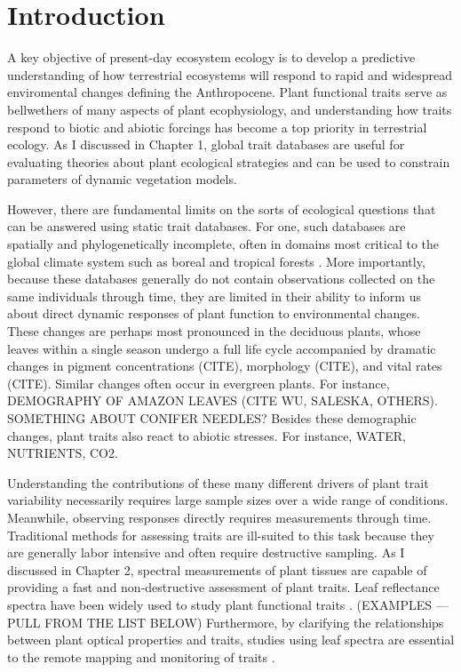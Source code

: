 \section{Introduction}

A key objective of present-day ecosystem ecology is to develop a predictive understanding of how terrestrial ecosystems will respond to rapid and widespread enviromental changes defining the Anthropocene. 
Plant functional traits serve as bellwethers of many aspects of plant ecophysiology, and understanding how traits respond to biotic and abiotic forcings has become a top priority in terrestrial ecology.
As I discussed in Chapter 1, global trait databases are useful for evaluating theories about plant ecological strategies and can be used to constrain parameters of dynamic vegetation models.

However, there are fundamental limits on the sorts of ecological questions that can be answered using static trait databases.
For one, such databases are spatially and phylogenetically incomplete, often in domains most critical to the global climate system such as boreal and tropical forests \cite{jetz2016_diversity}.
More importantly, because these databases generally do not contain observations collected on the same individuals through time, they are limited in their ability to inform us about direct dynamic responses of plant function to environmental changes.
These changes are perhaps most pronounced in the deciduous plants, whose leaves within a single season undergo a full life cycle accompanied by dramatic changes in pigment concentrations (CITE), morphology (CITE), and vital rates (CITE).
Similar changes often occur in evergreen plants.
For instance, DEMOGRAPHY OF AMAZON LEAVES (CITE WU, SALESKA, OTHERS).
SOMETHING ABOUT CONIFER NEEDLES?
Besides these demographic changes, plant traits also react to abiotic stresses.
For instance, WATER, NUTRIENTS, CO2.

Understanding the contributions of these many different drivers of plant trait variability necessarily requires large sample sizes over a wide range of conditions.
Meanwhile, observing responses directly requires measurements through time.
Traditional methods for assessing traits are ill-suited to this task because they are generally labor intensive and often require destructive sampling.
As I discussed in Chapter 2, spectral measurements of plant tissues are capable of providing a fast and non-destructive assessment of plant traits.
Leaf reflectance spectra have been widely used to study plant functional traits \cite{cavenderbares_2017_harnessing}.
(EXAMPLES --- PULL FROM THE LIST BELOW)
Furthermore, by clarifying the relationships between plant optical properties and traits, studies using leaf spectra are essential to the remote mapping and monitoring of traits \cite{schneider2017_mapping,schimel2013_observing,schimel2015_observing,jetz2016_diversity}.

